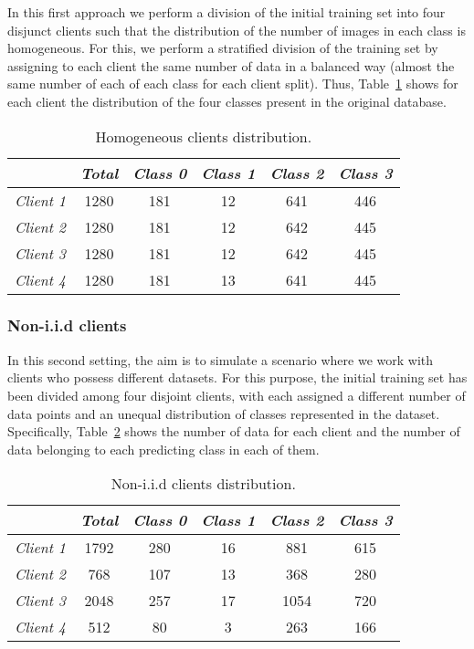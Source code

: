 \documentclass[5p,times]{elsarticle}
\begin{document}
In this first approach we perform a division of the initial training set into four disjunct clients such that the distribution of the number of images in each class is homogeneous. For this, we perform a stratified division of the training set by assigning to each client the same number of data in a balanced way (almost the same number of each of each class for each client split). Thus, Table~\ref{tab:homogeneous_distribution} shows for each client the distribution of the four classes present in the original database.

\begin{table}[ht]
    \centering
    \begin{tabular}{cccccc}
    \toprule
         & \textit{\textbf{Total}} & \textit{\textbf{Class 0}} & \textit{\textbf{Class 1}} & \textit{\textbf{Class 2}} & \textit{\textbf{Class 3}} \\
         \midrule
         \textit{Client 1} & 1280 & 181 & 12 & 641 & 446 \\
         \textit{Client 2} & 1280 & 181 & 12 & 642 & 445 \\
         \textit{Client 3} & 1280 & 181 & 12 & 642 & 445 \\
         \textit{Client 4} & 1280 & 181 & 13 & 641 & 445 \\
    \bottomrule
    \end{tabular}
    \caption{Homogeneous clients distribution.}
    \label{tab:homogeneous_distribution}
\end{table}

\subsubsection{Non-i.i.d clients}\label{sec:clients_noniid}

In this second setting, the aim is to simulate a scenario where we work with clients who possess different datasets. For this purpose, the initial training set has been divided among four disjoint clients, with each assigned a different number of data points and an unequal distribution of classes represented in the dataset. Specifically, Table~\ref{tab:noniid_distribution} shows the number of data for each client and the number of data belonging to each predicting class in each of them. 


\begin{table}[ht]
    \centering
    \begin{tabular}{cccccc}
    \toprule
         & \textit{\textbf{Total}} & \textit{\textbf{Class 0}} & \textit{\textbf{Class 1}} & \textit{\textbf{Class 2}} & \textit{\textbf{Class 3}} \\
         \midrule
         \textit{Client 1} & 1792 & 280 & 16 & 881 & 615\\
         \textit{Client 2} & 768 & 107 & 13 & 368 & 280\\
         \textit{Client 3} & 2048 & 257 & 17 & 1054 & 720\\
         \textit{Client 4} & 512 & 80 & 3 & 263 & 166\\
    \bottomrule
    \end{tabular}
    \caption{Non-i.i.d clients distribution.}
    \label{tab:noniid_distribution}
\end{table}
\end{document}
